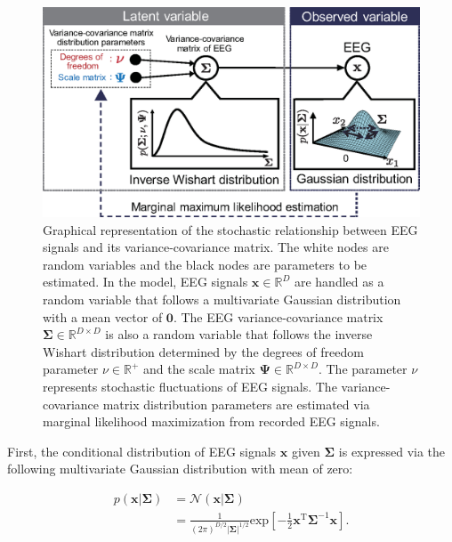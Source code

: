 \documentclass[journal]{IEEEtran}
\begin{document}
\begin{figure}[!t]
\centering
\includegraphics[width=1.0\hsize]{figure/fig1_ver2.eps}
\caption{Graphical representation of the stochastic relationship between EEG signals  and its variance-covariance matrix.
The white nodes are random variables and the black nodes are parameters to be estimated.
In the model, EEG signals $\mathbf{x} \in \mathbb{R}^{D}$ are handled as a random variable that follows a multivariate Gaussian distribution with a mean vector of $\mathbf{0}$.
The EEG variance-covariance matrix $\mathbf{\Sigma} \in \mathbb{R}^{D \times D}$ is also a random variable that follows the inverse Wishart distribution determined by the degrees of freedom parameter $\nu \in \mathbb{R}^+$ and the scale matrix $\mathbf{\Psi} \in \mathbb{R}^{D \times D}$. The parameter $\nu$ represents stochastic fluctuations of EEG signals.
The variance-covariance matrix distribution parameters are estimated via marginal likelihood maximization from recorded EEG signals.}
\label{fig:model}
\end{figure}
First, the conditional distribution of  EEG signals $\mathbf{x}$ given $\mathbf{\Sigma}$ is expressed via the following multivariate Gaussian distribution with mean of zero:

\begin{align}
	p(\mathbf{x}|{\mathbf{\Sigma}}) &= {\mathcal N}(\mathbf{x}|{\mathbf{\Sigma}}) \nonumber\\
&= \frac{1}{(2\pi)^{D/2} |\mathbf{\Sigma}|^{1/2}} \mathrm{exp} \left[-\frac{1}{2}\mathbf{x}^\mathrm{T} {\mathbf{\Sigma}}^{-1} \mathbf{x}\right]. \label{eq:gauss_x} %
\end{align}
\end{document}
